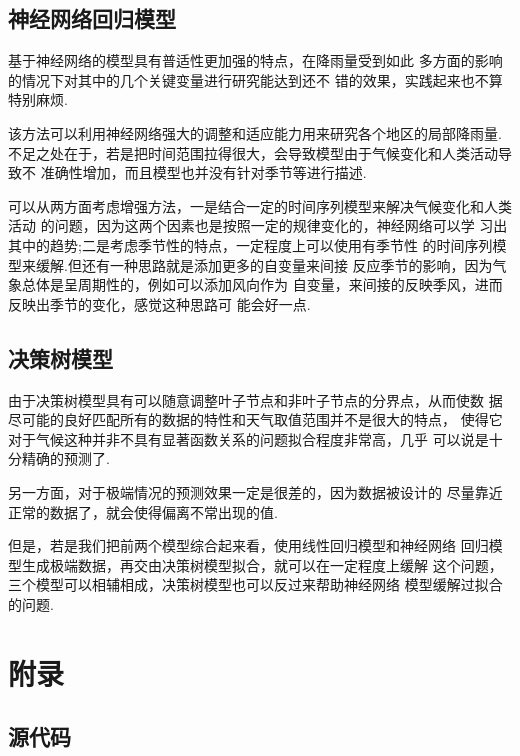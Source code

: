 \documentclass[UTF8, a4paper]{ctexart}
\begin{document}
\subsection{神经网络回归模型}
基于神经网络的模型具有普适性更加强的特点，在降雨量受到如此
多方面的影响的情况下对其中的几个关键变量进行研究能达到还不
错的效果，实践起来也不算特别麻烦.

该方法可以利用神经网络强大的调整和适应能力用来研究各个地区的局部降雨量.
不足之处在于，若是把时间范围拉得很大，会导致模型由于气候变化和人类活动导致不
准确性增加，而且模型也并没有针对季节等进行描述.

可以从两方面考虑增强方法，一是结合一定的时间序列模型来解决气候变化和人类活动
的问题，因为这两个因素也是按照一定的规律变化的，神经网络可以学
习出其中的趋势;二是考虑季节性的特点，一定程度上可以使用有季节性
的时间序列模型来缓解.但还有一种思路就是添加更多的自变量来间接
反应季节的影响，因为气象总体是呈周期性的，例如可以添加风向作为
自变量，来间接的反映季风，进而反映出季节的变化，感觉这种思路可
能会好一点.

\subsection{决策树模型}
由于决策树模型具有可以随意调整叶子节点和非叶子节点的分界点，从而使数
据尽可能的良好匹配所有的数据的特性和天气取值范围并不是很大的特点，
使得它对于气候这种并非不具有显著函数关系的问题拟合程度非常高，几乎
可以说是十分精确的预测了.

另一方面，对于极端情况的预测效果一定是很差的，因为数据被设计的
尽量靠近正常的数据了，就会使得偏离不常出现的值.

但是，若是我们把前两个模型综合起来看，使用线性回归模型和神经网络
回归模型生成极端数据，再交由决策树模型拟合，就可以在一定程度上缓解
这个问题，三个模型可以相辅相成，决策树模型也可以反过来帮助神经网络
模型缓解过拟合的问题.


\appendix
\setcounter{secnumdepth}{-2}
\section{附录}

\setcounter{secnumdepth}{3}
\subsection{源代码}
\end{document}
